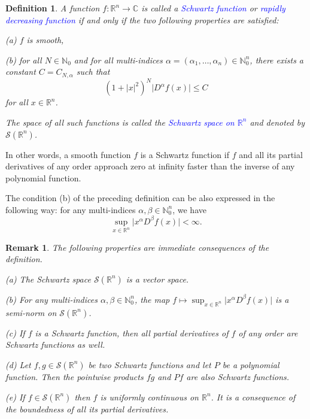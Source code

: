 \documentclass[12pt, oneside, a4paper]{article}
\theoremstyle{dfn}
\newtheorem{dfn}[thm]{Definition}
\newtheorem{rem}[thm]{Remark}
\def \S {\ensuremath{\mathcal{S}}}
\def \S {\ensuremath{\mathcal{S}}}
\def\Nbb{\mathbb{N}}
\def\Rbb{\ensuremath{\mathbb{R}}}
\newcommand{\Com}{\mathbb{C}}
\providecommand{\abs}[1]{\lvert#1\rvert}
\begin{document}
\begin{dfn}
A function $f \colon \Rbb^n \to \Com$ is called a \textcolor{blue}{Schwartz function} or \textcolor{blue}{rapidly decreasing function} if and only if the two following properties are satisfied:

(a) $f$ is smooth,

(b) for all $N \in \Nbb_0$ and for all multi-indices $\alpha = (\alpha_1, \ldots, \alpha_n) \in \Nbb_0^n$, there exists a constant $C = C_{N,\alpha}$ such that
	\[
	(1 + \abs{x}^2)^N \abs{D^\alpha f(x)} \leqslant C
	\]
	for all $x \in \Rbb^n$.

The space of all such functions is called the \textcolor{blue}{Schwartz space on $\Rbb^n$} and denoted by $\S(\Rbb^n)$.
\end{dfn}

In other words, a smooth function $f$ is a Schwartz function if $f$ and all its partial derivatives of any order approach zero at infinity faster than the inverse of any polynomial function.

The condition (b) of the preceding definition can be also expressed in the following way: for any multi-indices $\alpha, \beta \in \Nbb_0^n$, we have
\[
\sup_{x \in \Rbb^n} \abs{x^\alpha D^\beta f(x)} < \infty.
\]

\begin{rem}
The following properties are immediate consequences of the definition.

(a) The Schwartz space $\S(\Rbb^n)$ is a vector space.

(b) For any multi-indices $\alpha, \beta \in \Nbb_0^n$, the map $f \mapsto \sup_{x \in \Rbb^n} \abs{x^\alpha D^\beta f(x)}$ is a semi-norm on $\S(\Rbb^n)$.

(c) If $f$ is a Schwartz function, then all partial derivatives of $f$ of any order are Schwartz functions as well.

(d) Let $f,g \in \S(\Rbb^n)$ be two Schwartz functions and let $P$ be a polynomial function. Then the pointwise products $fg$ and $Pf$ are also Schwartz functions.

(e) If $f \in \S(\Rbb^n)$ then $f$ is uniformly continuous on $\Rbb^n$. It is a consequence of the boundedness of all its partial derivatives.
\end{rem}
\end{document}
